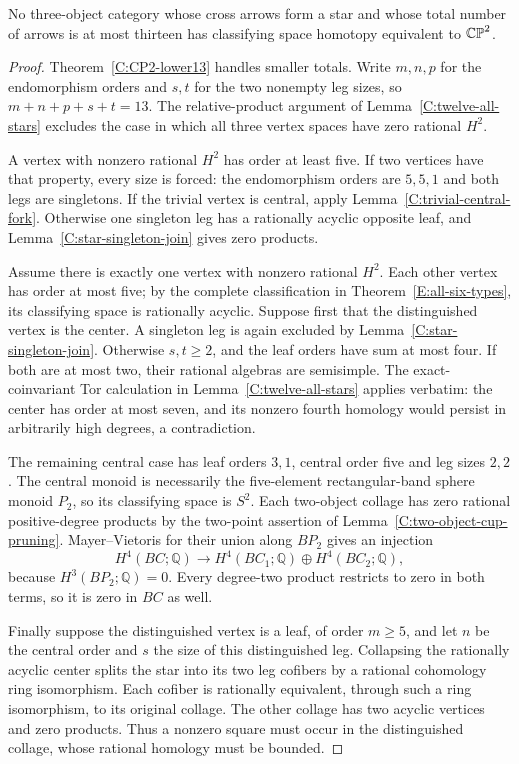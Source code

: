 \begin{theorem}\label{C:thirteen-all-stars}
No three-object category whose cross arrows form a star and
whose total number of arrows is at most thirteen has classifying
space homotopy equivalent to $\mathbb {CP}^2$.
\end{theorem}
\begin{proof}
Theorem~\ref{C:CP2-lower13} handles smaller totals.  Write
$m,n,p$ for the endomorphism orders and $s,t$ for the two nonempty
leg sizes, so $m+n+p+s+t=13$.  The relative-product argument of
Lemma~\ref{C:twelve-all-stars} excludes the case in which all
three vertex spaces have zero rational $H^2$.

A vertex with nonzero rational $H^2$ has order at least five.
If two vertices have that property, every size is forced:
the endomorphism orders are $5,5,1$ and both legs are singletons.
If the trivial vertex is central, apply
Lemma~\ref{C:trivial-central-fork}.  Otherwise one singleton leg
has a rationally acyclic opposite leaf, and
Lemma~\ref{C:star-singleton-join} gives zero products.

Assume there is exactly one vertex with nonzero rational $H^2$.
Each other vertex has order at most five; by the complete
classification in Theorem~\ref{E:all-six-types}, its classifying
space is rationally acyclic.  Suppose first that the distinguished
vertex is the center.  A singleton leg is again excluded by
Lemma~\ref{C:star-singleton-join}.  Otherwise $s,t\geq2$, and
the leaf orders have sum at most four.  If both are at most two,
their rational algebras are semisimple.  The exact-coinvariant
Tor calculation in Lemma~\ref{C:twelve-all-stars} applies verbatim:
the center has order at most seven, and its nonzero fourth homology
would persist in arbitrarily high degrees, a contradiction.

The remaining central case has leaf orders $3,1$, central order
five and leg sizes $2,2$.  The central monoid is necessarily the
five-element rectangular-band sphere monoid $P_2$, so its
classifying space is $S^2$.  Each two-object collage has zero
rational positive-degree products by the two-point assertion of
Lemma~\ref{C:two-object-cup-pruning}.  Mayer--Vietoris for their
union along $BP_2$ gives an injection
\[
 H^4(BC;\mathbb Q)\longrightarrow
 H^4(BC_1;\mathbb Q)\oplus H^4(BC_2;\mathbb Q),
\]
because $H^3(BP_2;\mathbb Q)=0$.  Every degree-two product
restricts to zero in both terms, so it is zero in $BC$ as well.

Finally suppose the distinguished vertex is a leaf, of order
$m\geq5$, and let $n$ be the central order and $s$ the size of
this distinguished leg.  Collapsing the rationally acyclic
center splits the star into its two leg cofibers by a rational
cohomology ring isomorphism.  Each cofiber is rationally equivalent,
through such a ring isomorphism, to its original collage.  The
other collage has two acyclic vertices and zero products.
Thus a nonzero square must occur in the distinguished collage,
whose rational homology must be bounded.


\end{proof}
